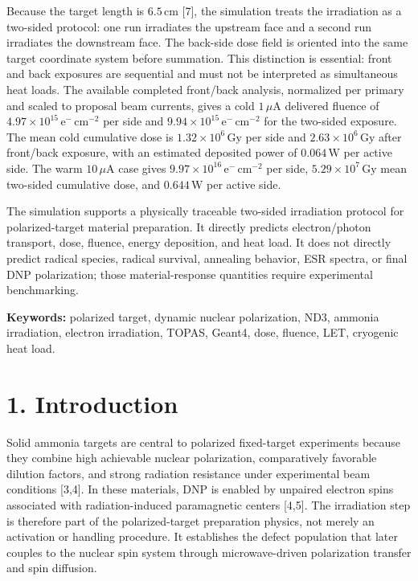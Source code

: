 \documentclass[
  12pt,
]{article}
\begin{document}
Because the target length is \(6.5\,\mathrm{cm}\) {[}7{]}, the
simulation treats the irradiation as a two-sided protocol: one run
irradiates the upstream face and a second run irradiates the downstream
face. The back-side dose field is oriented into the same target
coordinate system before summation. This distinction is essential: front
and back exposures are sequential and must not be interpreted as
simultaneous heat loads. The available completed front/back analysis,
normalized per primary and scaled to proposal beam currents, gives a
cold \(1\,\mu\mathrm{A}\) delivered fluence of
\(4.97 \times 10^{15}\,\mathrm{e}^{-}\,\mathrm{cm}^{-2}\) per side and
\(9.94 \times 10^{15}\,\mathrm{e}^{-}\,\mathrm{cm}^{-2}\) for the
two-sided exposure. The mean cold cumulative dose is
\(1.32 \times 10^{6}\,\mathrm{Gy}\) per side and
\(2.63 \times 10^{6}\,\mathrm{Gy}\) after front/back exposure, with an
estimated deposited power of \(0.064\,\mathrm{W}\) per active side. The
warm \(10\,\mu\mathrm{A}\) case gives
\(9.97 \times 10^{16}\,\mathrm{e}^{-}\,\mathrm{cm}^{-2}\) per side,
\(5.29 \times 10^{7}\,\mathrm{Gy}\) mean two-sided cumulative dose, and
\(0.644\,\mathrm{W}\) per active side.

The simulation supports a physically traceable two-sided irradiation
protocol for polarized-target material preparation. It directly predicts
electron/photon transport, dose, fluence, energy deposition, and heat
load. It does not directly predict radical species, radical survival,
annealing behavior, ESR spectra, or final DNP polarization; those
material-response quantities require experimental benchmarking.

\textbf{Keywords:} polarized target, dynamic nuclear polarization, ND3,
ammonia irradiation, electron irradiation, TOPAS, Geant4, dose, fluence,
LET, cryogenic heat load.

\hypertarget{introduction}{%
\section{1. Introduction}\label{introduction}}

Solid ammonia targets are central to polarized fixed-target experiments
because they combine high achievable nuclear polarization, comparatively
favorable dilution factors, and strong radiation resistance under
experimental beam conditions {[}3,4{]}. In these materials, DNP is
enabled by unpaired electron spins associated with radiation-induced
paramagnetic centers {[}4,5{]}. The irradiation step is therefore part
of the polarized-target preparation physics, not merely an activation or
handling procedure. It establishes the defect population that later
couples to the nuclear spin system through microwave-driven polarization
transfer and spin diffusion.
\end{document}
